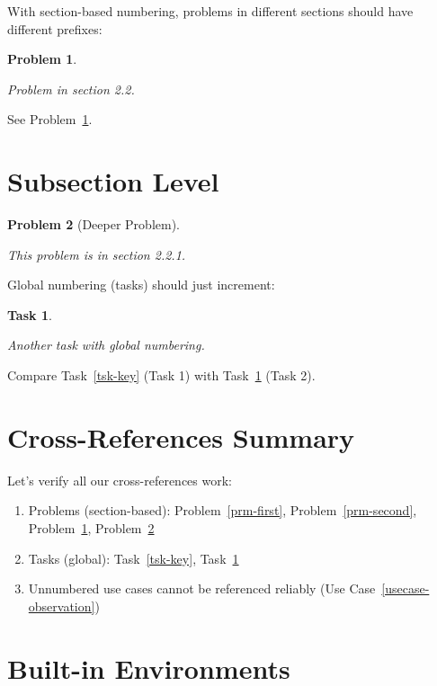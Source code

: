 \documentclass[
]{article}
\providecommand{\tightlist}{%
  \setlength{\itemsep}{0pt}\setlength{\parskip}{0pt}}
\newtheorem{task}{Task}
\newtheorem*{use case}{Use Case}
\newtheorem{problem}{Problem}[section]
\theoremstyle{definition}
\theoremstyle{plain}
\theoremstyle{remark}
\begin{document}
With section-based numbering, problems in different sections should have
different prefixes:

\begin{problem}\label{prm-subsection1}

Problem in section 2.2.

\end{problem}

See Problem~\ref{prm-subsection1}.

\section{Subsection Level}\label{subsection-level}

\begin{problem}[Deeper Problem]\label{prm-subsection2}

This problem is in section 2.2.1.

\end{problem}

Global numbering (tasks) should just increment:

\begin{task}\label{tsk-second}

Another task with global numbering.

\end{task}

Compare Task~\ref{tsk-key} (Task 1) with Task~\ref{tsk-second} (Task 2).

\section{Cross-References Summary}\label{cross-references-summary}

Let's verify all our cross-references work:

\begin{enumerate}
\def\labelenumi{\arabic{enumi}.}
\tightlist
\item
  Problems (section-based): Problem~\ref{prm-first},
  Problem~\ref{prm-second}, Problem~\ref{prm-subsection1},
  Problem~\ref{prm-subsection2}
\item
  Tasks (global): Task~\ref{tsk-key}, Task~\ref{tsk-second}
\item
  Unnumbered use cases cannot be referenced reliably
  (Use Case~\ref{usecase-observation})
\end{enumerate}

\section{Built-in Environments}\label{built-in-environments}
\end{document}

